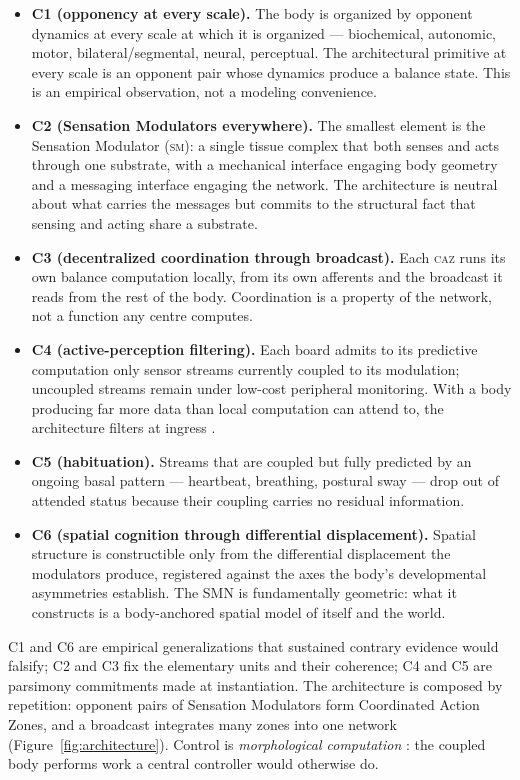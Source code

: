\documentclass[utf8]{FrontiersinHarvard}
\newcommand{\caz}{\textsc{caz}}
\newcommand{\sm}{\textsc{sm}}
\begin{document}
\begin{itemize}
\item \textbf{C1 (opponency at every scale).} The body is organized by opponent dynamics at every scale at which it is organized --- biochemical, autonomic, motor, bilateral/segmental, neural, perceptual. The architectural primitive at every scale is an opponent pair whose dynamics produce a balance state. This is an empirical observation, not a modeling convenience.
\item \textbf{C2 (Sensation Modulators everywhere).} The smallest element is the Sensation Modulator (\sm): a single tissue complex that both senses and acts through one substrate, with a mechanical interface engaging body geometry and a messaging interface engaging the network. The architecture is neutral about what carries the messages but commits to the structural fact that sensing and acting share a substrate.
\item \textbf{C3 (decentralized coordination through broadcast).} Each \caz{} runs its own balance computation locally, from its own afferents and the broadcast it reads from the rest of the body. Coordination is a property of the network, not a function any centre computes.
\item \textbf{C4 (active-perception filtering).} Each board admits to its predictive computation only sensor streams currently coupled to its modulation; uncoupled streams remain under low-cost peripheral monitoring. With a body producing far more data than local computation can attend to, the architecture filters at ingress \citep{OReganNoe2001Sensorimotor}.
\item \textbf{C5 (habituation).} Streams that are coupled but fully predicted by an ongoing basal pattern --- heartbeat, breathing, postural sway --- drop out of attended status because their coupling carries no residual information.
\item \textbf{C6 (spatial cognition through differential displacement).} Spatial structure is constructible only from the differential displacement the modulators produce, registered against the axes the body's developmental asymmetries establish. The SMN is fundamentally geometric: what it constructs is a body-anchored spatial model of itself and the world.
\end{itemize}

C1 and C6 are empirical generalizations that sustained contrary evidence would falsify; C2 and C3 fix the elementary units and their coherence; C4 and C5 are parsimony commitments made at instantiation. The architecture is composed by repetition: opponent pairs of Sensation Modulators form Coordinated Action Zones, and a broadcast integrates many zones into one network (Figure~\ref{fig:architecture}). Control is \emph{morphological computation} \citep{PfeiferBongard2006}: the coupled body performs work a central controller would otherwise do.
\end{document}
